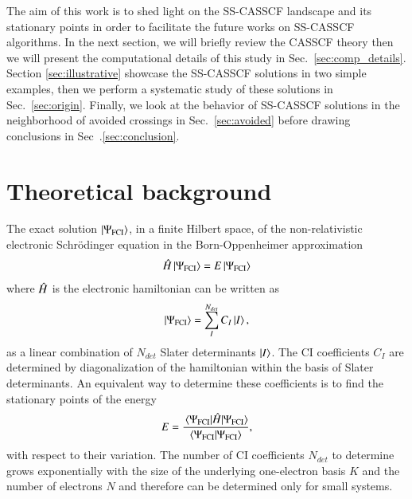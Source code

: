 \documentclass[aps,prb,reprint,showkeys,superscriptaddress]{revtex4-1}
\begin{document}
The aim of this work is to shed light on the SS-CASSCF landscape and its stationary points in order to facilitate the future works on SS-CASSCF algorithms.
In the next section, we will briefly review the CASSCF theory then we will present the computational details of this study in Sec.~\ref{sec:comp_details}. Section \ref{sec:illustrative} showcase the SS-CASSCF solutions in two simple examples, then we perform a systematic study of these solutions in Sec.~\ref{sec:origin}.
Finally, we look at the behavior of SS-CASSCF solutions in the neighborhood of avoided crossings in Sec.~\ref{sec:avoided} before drawing conclusions in Sec~.\ref{sec:conclusion}.

\section{Theoretical background}
\label{sec:theoretical}

The exact solution $\ket{\Psi_{\text{FCI}}}$, in a finite Hilbert space, of the non-relativistic electronic Schr\"odinger equation in the Born-Oppenheimer approximation
\begin{equation}
  \label{eq:schro_eq}
  \Hat{H} \ket{\Psi_{\text{FCI}}} = E \ket{\Psi_{\text{FCI}}}
\end{equation}
where $\Hat{H}$ is the electronic hamiltonian can be written as \cite{Szabo_1996}
\begin{equation}
  \label{eq:fci_wf}
  \ket{\Psi_{\text{FCI}}} = \sum_I^{N_{det}} C_I\ket{I},
\end{equation}
\ie as a linear combination of $N_{det}$ Slater determinants $\ket{I}$.
The CI coefficients $C_I$ are determined by diagonalization of the hamiltonian within the basis of Slater determinants.
An equivalent way to determine these coefficients is to find the stationary points of the energy
\begin{equation}
  \label{eq:fci_nrj}
  E = \frac{\mel{\Psi_{\text{FCI}}}{\Hat{H}}{\Psi_{\text{FCI}}}}{\braket{\Psi_{\text{FCI}}}{\Psi_{\text{FCI}}}},
\end{equation}
 with respect to their variation.
The number of CI coefficients $N_{det}$ to determine grows exponentially with the size of the underlying one-electron basis $K$ and the number of electrons $N$ and therefore can be determined only for small systems.
\end{document}
